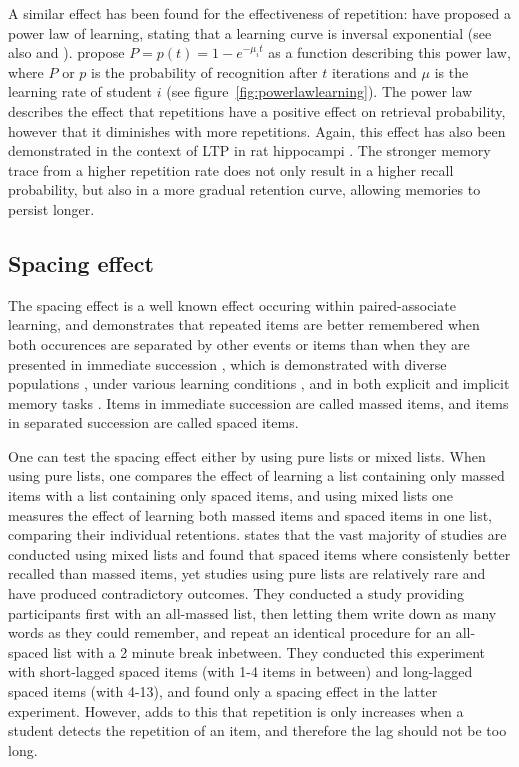 A similar effect has been found for the effectiveness of repetition:  have proposed a power law of learning, stating that a learning curve is inversal exponential (see also  and ).  propose $P = p(t) = 1-e^{-\mu_{i}t}$ as a function describing this power law, where $P$ or $p$ is the probability of recognition after $t$ iterations and $\mu$ is the learning rate of student $i$ (see figure~\ref{fig:powerlawlearning}). The power law describes the effect that repetitions have a positive effect on retrieval probability, however that it diminishes with more repetitions. Again, this effect has also been demonstrated in the context of LTP in rat hippocampi \cite{barnes}. The stronger memory trace from a higher repetition rate does not only result in a higher recall probability, but also in a more gradual retention curve, allowing memories to persist longer.

\subsection{Spacing effect}

The spacing effect is a well known effect occuring within paired-associate learning, and demonstrates that repeated items are better remembered when both occurences are separated by other events or items than when they are presented in immediate succession \cite{verkoeijen, logan, siegel, xue, karpicke2}, which is demonstrated with diverse populations \cite{verkoeijen, logan}, under various learning conditions \cite{verkoeijen, logan}, and in both explicit and implicit memory tasks \cite{verkoeijen}. Items in immediate succession are called massed items, and items in separated succession are called spaced items.

One can test the spacing effect either by using pure lists or mixed lists. When using pure lists, one compares the effect of learning a list containing only massed items with a list containing only spaced items, and using mixed lists one measures the effect of learning both massed items and spaced items in one list, comparing their individual retentions.  states that the vast majority of studies are conducted using mixed lists and found that spaced items where consistenly better recalled than massed items, yet studies using pure lists are relatively rare and have produced contradictory outcomes. They conducted a study providing participants first with an all-massed list, then letting them write down as many words as they could remember, and repeat an identical procedure for an all-spaced list with a 2 minute break inbetween. They conducted this experiment with short-lagged spaced items (with 1-4 items in between) and long-lagged spaced items (with 4-13), and found only a spacing effect in the latter experiment. However,  adds to this that repetition is only increases when a student detects the repetition of an item, and therefore the lag should not be too long.

